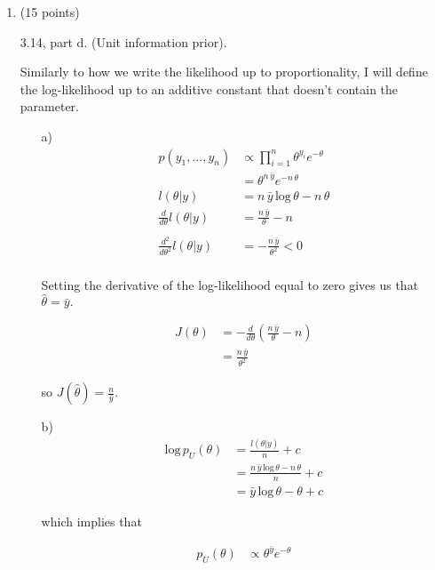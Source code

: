 \documentclass{article}
\begin{document}
\begin{enumerate}
\item (15 points) 

3.14, part d.  (Unit information prior). 


Similarly to how we write the likelihood up to proportionality, I will define the log-likelihood up to an additive constant that doesn't contain the parameter.
\begin{itemize}
 \item[a)]
    \begin{align*}
       p(y_1,...,y_n) &\propto \prod_{i=1}^n \theta^{y_i}e^{-\theta} \\
       & = \theta^{n\,\bar{y}}e^{-n\,\theta} \\ 
       l(\theta|y) &= n\,\bar{y}\,\text{log}\,\theta - n\,\theta \\ 
       \frac{d}{d\theta} l(\theta|y) &= \frac{n\,\bar{y}}{\theta} - n \\ 
 \\
\frac{d^2}{d\theta^2} l(\theta|y) &= -\frac{n\,\bar{y}}{\theta^2} < 0 \\ 
    \end{align*}
   
    
    Setting the derivative of the log-likelihood equal to zero gives us that $\hat{\theta}=\bar{y}.$
    
    \begin{align*}
        J(\theta) &= - \frac{d}{d\theta}\left(\frac{n\,\bar{y}}{\theta} - n\right) \\ 
        &= \frac{n\,\bar{y}}{\theta^2}
    \end{align*}
    
    so $J(\hat{\theta})=\frac{n}{\bar{y}}.$
    
\item[b)]
     \begin{align*}
         \text{log}\, p_U(\theta) &= \frac{l(\theta|y)}{n} + c \\ 
            &= \frac{n\,\bar{y}\,\text{log}\,\theta - n\,\theta}{n} + c \\ 
            &= \bar{y}\,\text{log}\,\theta - \theta + c  
     \end{align*}
     
     which implies that 
     
     \begin{align*}
         p_U(\theta) &\propto \theta^{\bar{y}}e^{-\theta}
     \end{align*}
     

\end{itemize}
\end{enumerate}
\end{document}
